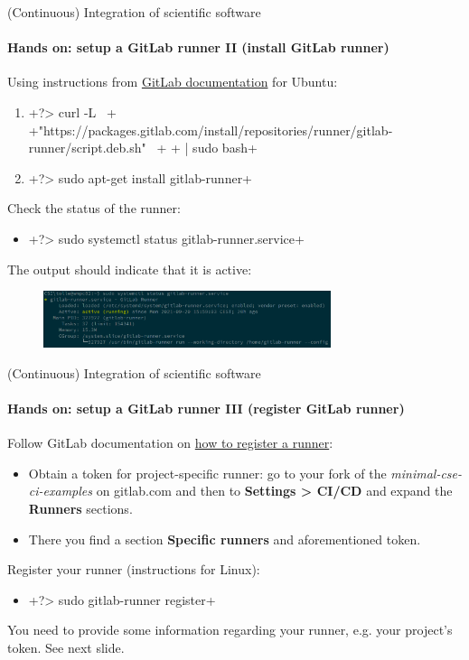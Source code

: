 \begin{frame}{(Continuous) Integration of scientific software}
    \framesubtitle{Hands on: setup a GitLab runner II (install GitLab runner)}
    Using instructions from \href{https://docs.gitlab.com/runner/install/linux-repository.html}{GitLab documentation} for Ubuntu:
    \begin{enumerate}
        \item {}+?> curl -L \ +
              +"https://packages.gitlab.com/install/repositories/runner/gitlab-runner/script.deb.sh" \ +
              +  | sudo bash+
        \item {}+?> sudo apt-get install gitlab-runner+
    \end{enumerate}
    Check the status of the runner:
    \begin{itemize}
        \item {}+?> sudo systemctl status gitlab-runner.service+
    \end{itemize}
    The output should indicate that it is active:
    \begin{figure}
        \includegraphics[width=0.75\textwidth]{figures/gitlab-runner-active.png}
    \end{figure}
\end{frame}


\begin{frame}{(Continuous) Integration of scientific software}
    \framesubtitle{Hands on: setup a GitLab runner III (register GitLab runner)}
    Follow GitLab documentation on \href{https://docs.gitlab.com/runner/register/index.html}{how to register a runner}:
    \begin{itemize}
        \item Obtain a token for project-specific runner: go to your fork of the \emph{minimal-cse-ci-examples} on gitlab.com and then to \textbf{Settings > CI/CD} and expand the \textbf{Runners} sections.
        \item There you find a section \textbf{Specific runners} and aforementioned token.
    \end{itemize}
    Register your runner (instructions for Linux):
    \begin{itemize}
        \item {}+?> sudo gitlab-runner register+
    \end{itemize}
    You need to provide some information regarding your runner, e.g. your project's token. See next slide.
\end{frame}


